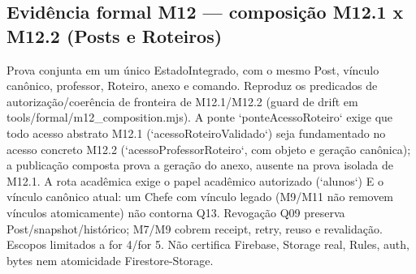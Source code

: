 \subsection*{Evidência formal M12 --- composição M12.1 x M12.2 (Posts e Roteiros)}
Prova conjunta em um único EstadoIntegrado, com o mesmo Post, vínculo canônico, professor, Roteiro, anexo e comando. Reproduz os predicados de autorização/coerência de fronteira de M12.1/M12.2 (guard de drift em tools/formal/m12\_composition.mjs). A ponte `ponteAcessoRoteiro` exige que todo acesso abstrato M12.1 (`acessoRoteiroValidado`) seja fundamentado no acesso concreto M12.2 (`acessoProfessorRoteiro`, com objeto e geração canônica); a publicação composta prova a geração do anexo, ausente na prova isolada de M12.1. A rota acadêmica exige o papel acadêmico autorizado (`alunos`) E o vínculo canônico atual: um Chefe com vínculo legado (M9/M11 não removem vínculos atomicamente) não contorna Q13. Revogação Q09 preserva Post/snapshot/histórico; M7/M9 cobrem receipt, retry, reuso e revalidação. Escopos limitados a for 4/for 5. Não certifica Firebase, Storage real, Rules, auth, bytes nem atomicidade Firestore-Storage.
